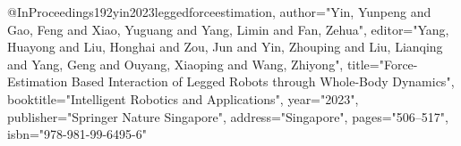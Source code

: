 @InProceedings{192yin2023leggedforceestimation,
author="Yin, Yunpeng
and Gao, Feng
and Xiao, Yuguang
and Yang, Limin
and Fan, Zehua",
editor="Yang, Huayong
and Liu, Honghai
and Zou, Jun
and Yin, Zhouping
and Liu, Lianqing
and Yang, Geng
and Ouyang, Xiaoping
and Wang, Zhiyong",
title="Force-Estimation Based Interaction of Legged Robots through Whole-Body Dynamics",
booktitle="Intelligent Robotics and Applications",
year="2023",
publisher="Springer Nature Singapore",
address="Singapore",
pages="506--517",
isbn="978-981-99-6495-6"
}